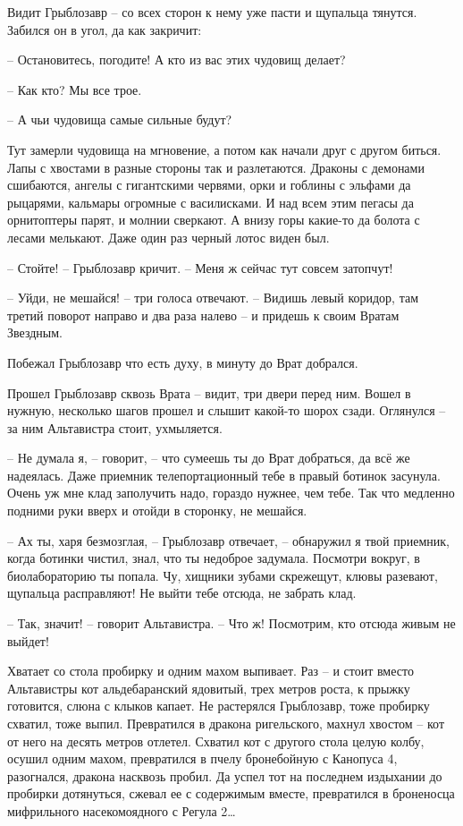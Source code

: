 \documentclass[ebook,oneside,final,openright]{memoir}
\begin{document}
\par
Видит Грыблозавр – со всех сторон к нему уже пасти и щупальца тянутся. Забился он в угол, да как закричит:\par
– Остановитесь, погодите! А кто из вас этих чудовищ делает?\par
– Как кто? Мы все трое.\par
– А чьи чудовища самые сильные будут?\par
Тут замерли чудовища на мгновение, а потом как начали друг с другом биться. Лапы с хвостами в разные стороны так и разлетаются. Драконы с демонами сшибаются, ангелы с гигантскими червями, орки и гоблины с эльфами да рыцарями, кальмары огромные с василисками. И над всем этим пегасы да орнитоптеры парят, и молнии сверкают. А внизу горы какие-то да болота с лесами мелькают. Даже один раз черный лотос виден был. \par
– Стойте! – Грыблозавр кричит. – Меня ж сейчас тут совсем затопчут!\par
– Уйди, не мешайся! – три голоса отвечают. – Видишь левый коридор, там третий поворот направо и два раза налево – и придешь к своим Вратам Звездным.\par
\par
Побежал Грыблозавр что есть духу, в минуту до Врат добрался.\par
\par
Прошел Грыблозавр сквозь Врата – видит, три двери перед ним. Вошел в нужную, несколько шагов прошел и слышит какой-то шорох сзади. Оглянулся – за ним Альтавистра стоит, ухмыляется. \par
\par
– Не думала я, – говорит, – что сумеешь ты до Врат добраться, да всё же надеялась. Даже приемник телепортационный тебе в правый ботинок засунула. Очень уж мне клад заполучить надо, гораздо нужнее, чем тебе. Так что медленно подними руки вверх и отойди в сторонку, не мешайся.\par
– Ах ты, харя безмозглая, – Грыблозавр отвечает, – обнаружил я твой приемник, когда ботинки чистил, знал, что ты недоброе задумала. Посмотри вокруг, в биолабораторию ты попала. Чу, хищники зубами скрежещут, клювы разевают, щупальца расправляют! Не выйти тебе отсюда, не забрать клад.\par
– Так, значит! – говорит Альтавистра. – Что ж! Посмотрим, кто отсюда живым не выйдет!\par
\par
Хватает со стола пробирку и одним махом выпивает. Раз – и стоит вместо Альтавистры кот альдебаранский ядовитый, трех метров роста, к прыжку готовится, слюна с клыков капает. Не растерялся Грыблозавр, тоже пробирку схватил, тоже выпил. Превратился в дракона ригельского, махнул хвостом – кот от него на десять метров отлетел. Схватил кот с другого стола целую колбу, осушил одним махом, превратился в пчелу бронебойную с Канопуса 4, разогнался, дракона насквозь пробил. Да успел тот на последнем издыхании до пробирки дотянуться, сжевал ее с содержимым вместе, превратился в броненосца мифрильного насекомоядного с Регула 2…\par
\end{document}
